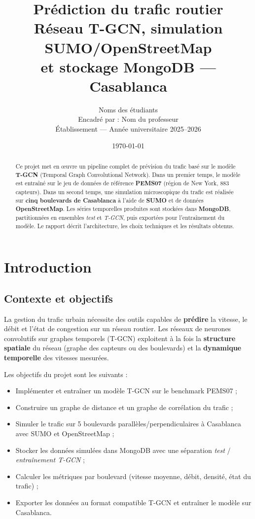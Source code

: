 \documentclass[12pt,a4paper]{report}
\title{%
  \textbf{Prédiction du trafic routier}\\[0.4cm]
  \large Réseau T-GCN, simulation SUMO/OpenStreetMap\\[0.2cm]
  \large et stockage MongoDB — Casablanca%
}
\author{%
  Noms des étudiants\\[0.2cm]
  Encadré par : Nom du professeur\\[0.2cm]
  Établissement — Année universitaire 2025--2026%
}
\date{\today}
\begin{document}
\maketitle
\thispagestyle{empty}

\begin{abstract}
Ce projet met en œuvre un pipeline complet de prévision du trafic basé sur le
modèle \textbf{T-GCN} (Temporal Graph Convolutional Network). Dans un premier
temps, le modèle est entraîné sur le jeu de données de référence \textbf{PEMS07}
(région de New York, 883 capteurs). Dans un second temps, une simulation
microscopique du trafic est réalisée sur \textbf{cinq boulevards de Casablanca}
à l'aide de \textbf{SUMO} et de données \textbf{OpenStreetMap}. Les séries
temporelles produites sont stockées dans \textbf{MongoDB}, partitionnées en
ensembles \emph{test} et \emph{T-GCN}, puis exportées pour l'entraînement du
modèle. Le rapport décrit l'architecture, les choix techniques et les résultats
obtenus.
\end{abstract}

\tableofcontents
\newpage

\chapter{Introduction}

\section{Contexte et objectifs}

La gestion du trafic urbain nécessite des outils capables de \textbf{prédire}
la vitesse, le débit et l'état de congestion sur un réseau routier. Les
réseaux de neurones convolutifs sur graphes temporels (T-GCN) exploitent à la
fois la \textbf{structure spatiale} du réseau (graphe des capteurs ou des
boulevards) et la \textbf{dynamique temporelle} des vitesses mesurées.

Les objectifs du projet sont les suivants :
\begin{itemize}
  \item Implémenter et entraîner un modèle T-GCN sur le benchmark PEMS07 ;
  \item Construire un graphe de distance et un graphe de corrélation du trafic ;
  \item Simuler le trafic sur 5 boulevards parallèles/perpendiculaires à
        Casablanca avec SUMO et OpenStreetMap ;
  \item Stocker les données simulées dans MongoDB avec une séparation
        \emph{test} / \emph{entraînement T-GCN} ;
  \item Calculer les métriques par boulevard (vitesse moyenne, débit, densité,
        état du trafic) ;
  \item Exporter les données au format compatible T-GCN et entraîner le modèle
        sur Casablanca.
\end{itemize}
\end{document}

